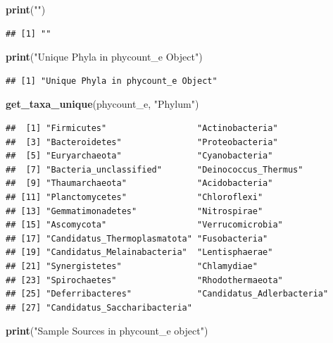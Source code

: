 \documentclass[
]{article}
\newenvironment{Shaded}{\begin{snugshade}}{\end{snugshade}}
\newcommand{\FunctionTok}[1]{\textcolor[rgb]{0.13,0.29,0.53}{\textbf{#1}}}
\newcommand{\NormalTok}[1]{#1}
\newcommand{\StringTok}[1]{\textcolor[rgb]{0.31,0.60,0.02}{#1}}
\begin{document}
\begin{Shaded}
\begin{Highlighting}[]
\FunctionTok{print}\NormalTok{(}\StringTok{""}\NormalTok{)}
\end{Highlighting}
\end{Shaded}

\begin{verbatim}
## [1] ""
\end{verbatim}

\begin{Shaded}
\begin{Highlighting}[]
\FunctionTok{print}\NormalTok{(}\StringTok{"Unique Phyla in phycount\_e Object"}\NormalTok{)}
\end{Highlighting}
\end{Shaded}

\begin{verbatim}
## [1] "Unique Phyla in phycount_e Object"
\end{verbatim}

\begin{Shaded}
\begin{Highlighting}[]
\FunctionTok{get\_taxa\_unique}\NormalTok{(phycount\_e, }\StringTok{"Phylum"}\NormalTok{)}
\end{Highlighting}
\end{Shaded}

\begin{verbatim}
##  [1] "Firmicutes"                  "Actinobacteria"             
##  [3] "Bacteroidetes"               "Proteobacteria"             
##  [5] "Euryarchaeota"               "Cyanobacteria"              
##  [7] "Bacteria_unclassified"       "Deinococcus_Thermus"        
##  [9] "Thaumarchaeota"              "Acidobacteria"              
## [11] "Planctomycetes"              "Chloroflexi"                
## [13] "Gemmatimonadetes"            "Nitrospirae"                
## [15] "Ascomycota"                  "Verrucomicrobia"            
## [17] "Candidatus_Thermoplasmatota" "Fusobacteria"               
## [19] "Candidatus_Melainabacteria"  "Lentisphaerae"              
## [21] "Synergistetes"               "Chlamydiae"                 
## [23] "Spirochaetes"                "Rhodothermaeota"            
## [25] "Deferribacteres"             "Candidatus_Adlerbacteria"   
## [27] "Candidatus_Saccharibacteria"
\end{verbatim}

\begin{Shaded}
\begin{Highlighting}[]
\FunctionTok{print}\NormalTok{(}\StringTok{"Sample Sources in phycount\_e object"}\NormalTok{)}
\end{Highlighting}
\end{Shaded}
\end{document}
